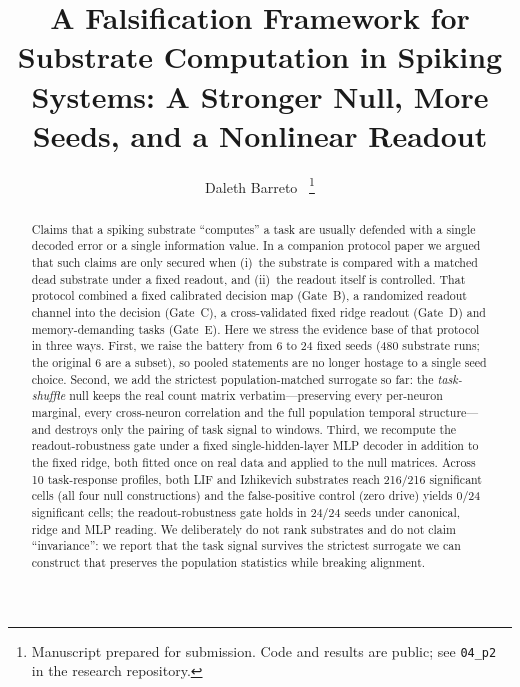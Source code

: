 \documentclass[journal]{IEEEtran}
\begin{document}
\title{A Falsification Framework for Substrate Computation in Spiking Systems:
  A Stronger Null, More Seeds, and a Nonlinear Readout}

\author{Daleth Barreto~\IEEEmembership{}
\thanks{Manuscript prepared for submission. Code and results are public; see
\texttt{04\_p2} in the research repository.}}


\maketitle

\begin{abstract}
Claims that a spiking substrate ``computes'' a task are usually defended with a
single decoded error or a single information value. In a companion protocol paper
we argued that such claims are only secured when (i)~the substrate is compared
with a matched dead substrate under a fixed readout, and (ii)~the readout itself
is controlled. That protocol combined a fixed calibrated decision map (Gate~B), a
randomized readout channel into the decision (Gate~C), a cross-validated fixed
ridge readout (Gate~D) and memory-demanding tasks (Gate~E). Here we stress the
evidence base of that protocol in three ways. First, we raise the battery from 6
to 24 fixed seeds (480 substrate runs; the original 6 are a subset), so pooled
statements are no longer hostage to a single seed choice. Second, we add the
strictest population-matched surrogate so far: the \emph{task-shuffle} null keeps
the real count matrix verbatim---preserving every per-neuron marginal, every
cross-neuron correlation and the full population temporal structure---and
destroys only the pairing of task signal to windows. Third, we recompute the
readout-robustness gate under a fixed single-hidden-layer MLP decoder in addition
to the fixed ridge, both fitted once on real data and applied to the null
matrices. Across 10 task-response profiles, both LIF and Izhikevich substrates
reach 216/216 significant cells (all four null constructions) and the
false-positive control (zero drive) yields 0/24 significant cells; the
readout-robustness gate holds in 24/24 seeds under canonical, ridge and MLP
reading. We deliberately do not rank substrates and do not claim ``invariance'':
we report that the task signal survives the strictest surrogate we can construct
that preserves the population statistics while breaking alignment.
\end{abstract}
\end{document}
